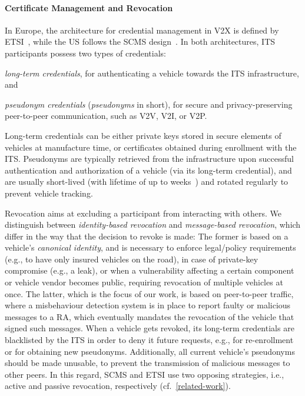 \paragraph{Certificate Management and Revocation}
%
In Europe, the architecture for credential management in \ac{V2X} is defined by
ETSI~\cite{etsi2021102940,etsi2022102941}, while the US follows the \ac{SCMS}
design~\cite{brecht2018scms}. In both architectures, \ac{ITS} participants
possess two types of credentials: %
%
\begin{paraenum}
    \item \emph{long-term credentials}, for authenticating a vehicle towards the
    \ac{ITS} infrastructure, and
    \item \emph{pseudonym credentials} (\emph{pseudonyms} in short), for secure
    and privacy-preserving peer-to-peer communication, such as \ac{V2V},
    \ac{V2I}, or \ac{V2P}.
\end{paraenum} 
%
Long-term credentials can be either private keys stored in secure elements of
vehicles at manufacture time, or certificates obtained during enrollment with
the \ac{ITS}. Pseudonyms are typically retrieved from the infrastructure upon
successful authentication and authorization of a vehicle (via its long-term
credential), and are usually short-lived (with lifetime of up to
weeks~\cite{etsi2018tr04103415}) and rotated regularly to prevent vehicle
tracking.

Revocation aims at excluding a participant from interacting with others. We
distinguish between \emph{identity-based revocation} and \emph{message-based
revocation}, which differ in the way that the decision to revoke is made: The
former is based on a vehicle's \emph{canonical identity}, and is necessary to
enforce legal/policy requirements (e.g., to have only insured vehicles on the
road), in case of private-key compromise (e.g., a leak), or when a vulnerability
affecting a certain component or vehicle vendor becomes public, requiring
revocation of multiple vehicles at once. The latter, which is the focus of our
work, is based on peer-to-peer traffic, where a misbehaviour detection system is
in place to report faulty or malicious messages to a \ac{RA}, which eventually
mandates the revocation of the vehicle that signed such messages. When a vehicle
gets revoked, its long-term credentials are blacklisted by the \ac{ITS} in order
to deny it future requests, e.g., for re-enrollment or for obtaining new
pseudonyms. Additionally, all current vehicle's pseudonyms should be made
unusable, to prevent the transmission of malicious messages to other peers. In
this regard, \ac{SCMS} and ETSI use two opposing strategies, i.e., active and
passive revocation, respectively (cf.~\cref{related-work}).

